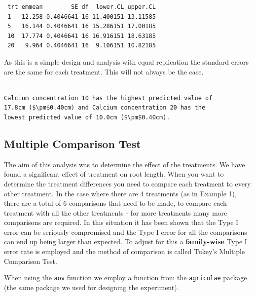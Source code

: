 \documentclass[a4paper, 10pt, fleqn, twosided]{memoir}
\begin{document}
\begin{tcolorbox}[title = Example 1 Predicted output]
\begin{verbatim}
 trt emmean        SE df  lower.CL upper.CL
 1   12.258 0.4046641 16 11.400151 13.11585
 5   16.144 0.4046641 16 15.286151 17.00185
 10  17.774 0.4046641 16 16.916151 18.63185
 20   9.964 0.4046641 16  9.106151 10.82185
\end{verbatim}
\end{tcolorbox}

As this is a simple design and analysis with equal replication the standard errors are the same for each treatment.
This will not always be the case.

\begin{tcolorbox}[title = Example 1 Prediction interpretation]
\begin{lstlisting}

Calcium concentration 10 has the highest predicted value of
17.8cm ($\pm$0.40cm) and Calcium concentration 20 has the
lowest predicted value of 10.0cm ($\pm$0.40cm).
\end{lstlisting}
\end{tcolorbox}


\subsection{Multiple Comparison Test}

The aim of this analysis was to determine the effect of the treatments. We have found a significant effect of treatment
on root length. When you want to determine the treatment differences you need to compare each treatment to every other
treatment. In the case where there are 4 treatments (as in Example 1), there are a total of 6 comparisons that need to
be made, to compare each treatment with all the other treatments - for more treatments many more comparisons are
required. In this situation it has been shown that the Type I error can be seriously compromised and the Type I error
for all the comparisons can end up being larger than expected. To adjust for this a \textbf{family-wise} Type I error
rate is employed and the method of comparison is called Tukey's Multiple Comparison Test.

When using the \texttt{aov} function we employ a function from the \texttt{agricolae} package (the same package we used
for designing the experiment).
\end{document}
